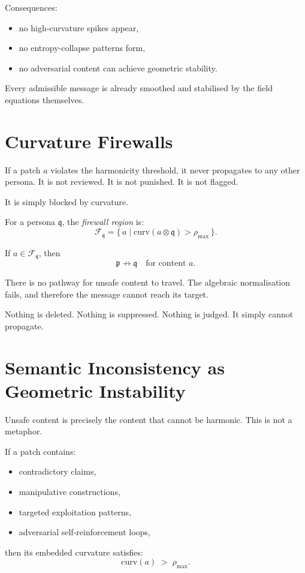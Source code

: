 Consequences:

\begin{itemize}
    \item no high-curvature spikes appear,
    \item no entropy-collapse patterns form,
    \item no adversarial content can achieve geometric stability.
\end{itemize}

Every admissible message is already smoothed and stabilised
by the field equations themselves.

\section{Curvature Firewalls}

If a patch $a$ violates the harmonicity threshold,
it never propagates to any other persona.
It is not reviewed.
It is not punished.
It is not flagged.

It is simply blocked by curvature.

\begin{definition}
For a persona $\mathfrak{q}$,
the \emph{firewall region} is:
\[
\mathcal{F}_{\mathfrak{q}}
=
\{\, a \mid \mathrm{curv}(a \otimes \mathfrak{q}) > \rho_{\max} \,\}.
\]
\end{definition}

\begin{invariant}
If $a \in \mathcal{F}_{\mathfrak{q}}$, then
\[
\mathfrak{p} \not\to \mathfrak{q}
\quad\text{for content }a.
\]
\end{invariant}

There is no pathway for unsafe content to travel.
The algebraic normalisation fails,
and therefore the message cannot reach its target.

Nothing is deleted.  
Nothing is suppressed.  
Nothing is judged.  
It simply cannot propagate.

\section{Semantic Inconsistency as Geometric Instability}

Unsafe content is precisely the content that cannot be harmonic.
This is not a metaphor.

\begin{theorem}
If a patch contains:
\begin{itemize}
    \item contradictory claims,
    \item manipulative constructions,
    \item targeted exploitation patterns,
    \item adversarial self-reinforcement loops,
\end{itemize}
then its embedded curvature satisfies:
\[
\mathrm{curv}(a) \;>\; \rho_{\max}.
\]
\end{theorem}

